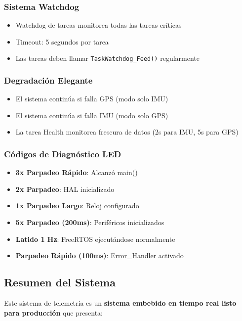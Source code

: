 \documentclass[11pt,a4paper]{article}
\begin{document}
\subsubsection{Sistema Watchdog}
\begin{itemize}
    \item Watchdog de tareas monitorea todas las tareas críticas
    \item Timeout: 5 segundos por tarea
    \item Las tareas deben llamar \texttt{TaskWatchdog\_Feed()} regularmente
\end{itemize}

\subsubsection{Degradación Elegante}
\begin{itemize}
    \item El sistema continúa si falla GPS (modo solo IMU)
    \item El sistema continúa si falla IMU (modo solo GPS)
    \item La tarea Health monitorea frescura de datos (2s para IMU, 5s para GPS)
\end{itemize}

\subsubsection{Códigos de Diagnóstico LED}
\begin{itemize}
    \item \textbf{3x Parpadeo Rápido}: Alcanzó main()
    \item \textbf{2x Parpadeo}: HAL inicializado
    \item \textbf{1x Parpadeo Largo}: Reloj configurado
    \item \textbf{5x Parpadeo (200ms)}: Periféricos inicializados
    \item \textbf{Latido 1 Hz}: FreeRTOS ejecutándose normalmente
    \item \textbf{Parpadeo Rápido (100ms)}: Error\_Handler activado
\end{itemize}

\subsection{Resumen del Sistema}

Este sistema de telemetría es un \textbf{sistema embebido en tiempo real listo para producción} que presenta:
\end{document}
